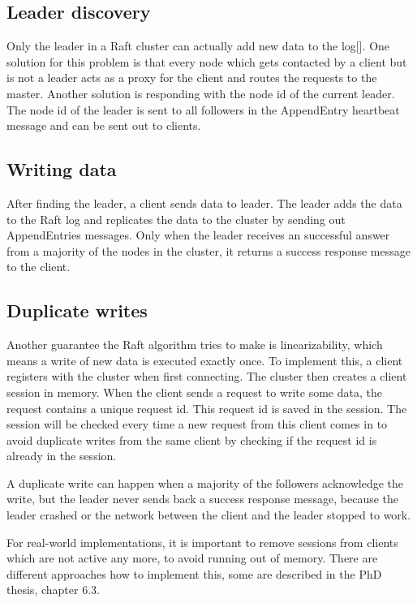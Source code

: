 \subsection{Leader discovery}
Only the leader in a Raft cluster can actually add new data to the log[]. One solution for this problem is that every node which gets contacted by a client but is not a leader acts as a proxy for the client and routes the requests to the master. Another solution is responding with the node id of the current leader. The node id of the leader is sent to all followers in the AppendEntry heartbeat message and can be sent out to clients.

\subsection{Writing data}
After finding the leader, a client sends data to leader. The leader adds the data to the Raft log and replicates the data to the cluster by sending out AppendEntries messages. Only when the leader receives an successful answer from a majority of the nodes in the cluster, it returns a success response message to the client.

\subsection{Duplicate writes}
Another guarantee the Raft algorithm tries to make is linearizability, which means a write of new data is executed exactly once. To implement this, a client registers with the cluster when first connecting. The cluster then creates a client session in memory. When the client sends a request to write some data, the request contains a unique request id. This request id is saved in the session. The session will be checked every time a new request from this client comes in to avoid duplicate writes from the same client by checking if the request id is already in the session.

A duplicate write can happen when a majority of the followers acknowledge the write, but the leader never sends back a success response message, because the leader crashed or the network between the client and the leader stopped to work.

For real-world implementations, it is important to remove sessions from clients which are not active any more, to avoid running out of memory. There are different approaches how to implement this, some are described in the PhD thesis\cite{raft_phd_thesis}, chapter 6.3.

